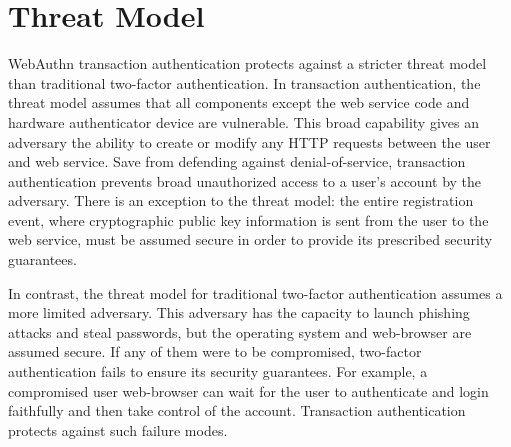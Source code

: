 \section{Threat Model}\label{Sec:ThreatModel}




WebAuthn transaction authentication protects against a stricter threat model than traditional two-factor authentication. In transaction authentication, the threat model assumes that all components except the web service code and hardware authenticator device are vulnerable. This broad capability gives an adversary the ability to create or modify any HTTP requests between the user and web service. Save from defending against denial-of-service, transaction authentication prevents broad unauthorized access to a user's account by the adversary. There is an exception to the threat model: the entire registration event, where cryptographic public key information is sent from the user to the web service, must be assumed secure in order to provide its prescribed security guarantees.


In contrast, the threat model for traditional two-factor authentication assumes a more limited adversary. This adversary has the capacity to launch phishing attacks and steal passwords, but the operating system and web-browser are assumed secure. If any of them were to be compromised, two-factor authentication fails to ensure its security guarantees. For example, a compromised user web-browser can wait for the user to authenticate and login faithfully and then take control of the account. Transaction authentication protects against such failure modes.



